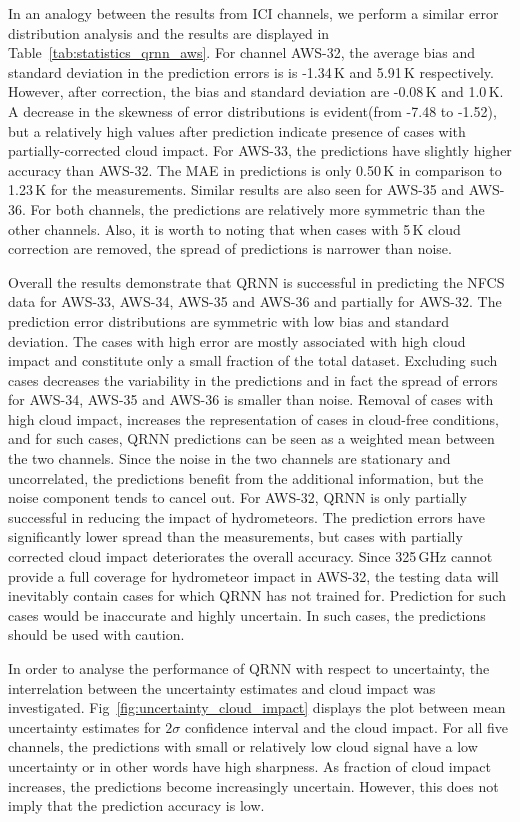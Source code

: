 \documentclass[amt, manuscript]{copernicus}
\begin{document}
In an analogy between the results from ICI channels, we perform a similar error distribution analysis 
and the results are displayed in Table~\ref{tab:statistics_qrnn_aws}. For channel AWS-32, the average bias and standard deviation in the prediction errors is is -1.34\,K and 5.91\,K respectively. However, after correction, the bias and standard deviation are -0.08\,K and 1.0\,K. A decrease in the skewness of error distributions is evident(from -7.48 to -1.52), but a relatively high values after prediction indicate presence of cases with partially-corrected cloud impact. For AWS-33, the predictions have slightly higher accuracy than AWS-32. The MAE in predictions is only 0.50\,K in comparison to 1.23\,K for the measurements. Similar results are also seen for AWS-35 and AWS-36. For both channels, the predictions are relatively more symmetric than the other channels. Also, it is worth to noting that when cases with 5\,K cloud correction are removed, the spread of predictions is narrower than noise. 

Overall the results demonstrate that QRNN is successful in predicting the NFCS data for AWS-33, AWS-34, AWS-35 and AWS-36 and partially for AWS-32. The prediction error distributions are symmetric with low bias and standard deviation. The cases with high error are mostly associated with high cloud impact and constitute only a small fraction of the total dataset. Excluding such cases decreases the variability in the predictions and in fact the spread of errors for AWS-34, AWS-35 and AWS-36 is smaller than noise. Removal of cases with high cloud impact, increases the representation of cases in cloud-free conditions, and for such cases, QRNN predictions can be seen as a weighted mean between the two channels. Since the noise in the two channels are stationary and uncorrelated, the predictions benefit from the additional information, but the noise component tends to cancel out. For AWS-32, QRNN is only partially successful in reducing the impact of hydrometeors. The prediction errors have significantly lower spread than the measurements, but cases with partially corrected cloud impact deteriorates the overall accuracy. Since 325\,GHz cannot provide a full coverage for hydrometeor impact in AWS-32, the testing data will inevitably contain cases for which QRNN has not trained for. Prediction for such cases would be inaccurate and highly uncertain. In such cases, the predictions should be used with caution. 

In order to analyse the performance of QRNN with respect to uncertainty, the interrelation between the uncertainty estimates and cloud impact was investigated. Fig~\ref{fig:uncertainty_cloud_impact} displays the plot between mean uncertainty estimates for $2\sigma$ confidence interval and the cloud impact. For all five channels, the predictions with small or relatively low cloud signal have a low uncertainty or in other words have high sharpness. As fraction of cloud impact increases, the predictions become increasingly uncertain. However, this does not imply that the prediction accuracy is low. 
\end{document}
